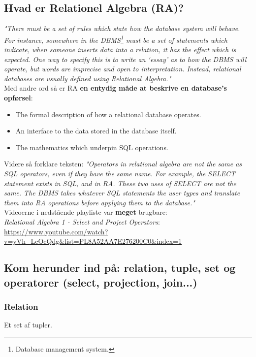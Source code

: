 \newpage

\subsection{Hvad er Relationel Algebra (RA)?}

\textit{"There must be a set of rules which state how the database system will behave. For instance, somewhere in the DBMS\footnote{Database management system.} must be a set of statements which indicate, when someone inserts data into a relation, it has the effect which is expected. One way to specify this is to write an `essay' as to how the DBMS will operate, but words are imprecise and open to interpretation. Instead, relational databases are usually defined using Relational Algebra."}\\

Med andre ord så er RA \textbf{en entydig måde at beskrive en database's opførsel}: 

\begin{itemize}
	\item The formal description of how a relational database operates.
	\item An interface to the data stored in the database itself.
	\item The mathematics which underpin SQL operations.
\end{itemize}

Videre så forklare teksten: \textit{"Operators in relational algebra are not the same as SQL operators, even if they have the same name. For example, the SELECT statement exists in SQL, and in RA. These two uses of SELECT are not the same. The DBMS takes whatever SQL statements the user types and translate them into RA operations before applying them to the database."}\\

Videoerne i nedstående playliste var \textbf{meget} brugbare:\\
\textit{Relational Algebra 1 - Select and Project Operators}:\\
\url{https://www.youtube.com/watch?v=yVh_LcOcQdg&list=PL8A52AA7E276200C0&index=1}

\subsection{Kom herunder ind på: relation, tuple, set og operatorer (select, projection, join...)}

\subsubsection{Relation}
Et set af tupler.

